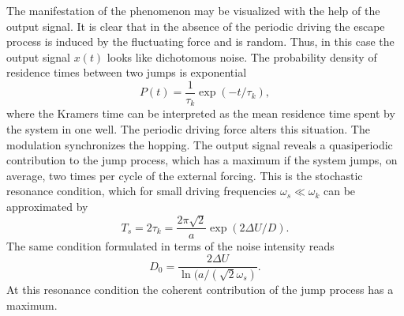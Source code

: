 The manifestation of the phenomenon may be visualized with the help of the
output signal. It is clear that in the absence of the periodic driving
the escape process is induced by the fluctuating force and is random. Thus, in
this case the output signal $x(t)$ looks like dichotomous noise. The
probability density of residence times between two jumps is exponential
\begin{equation}
  P(t) = \frac{1}{\tau_k} \exp(-t/\tau_k),
\end{equation}
where the Kramers time can be
interpreted as the mean residence time spent by the system in one well.
The periodic driving force alters this situation. The modulation synchronizes
the hopping. The output signal reveals a quasiperiodic contribution to the
jump process, which has a maximum if the system jumps, on average, two times
per cycle of the external forcing. This is the stochastic resonance condition,
which for small driving frequencies $\omega_s \ll \omega_k$ 
can be approximated by \cite{Jung}
\begin{equation}
\label{eq:ResonanceCondition}
  T_s = 2 \tau_k = \frac{2 \pi \sqrt{2}}{a} \exp(2 \Delta U / D).
\end{equation}
The same condition formulated in terms of the noise intensity reads
\begin{equation}
\label{eq:ResonanceConditionD}
  D_0 = \frac{2 \Delta U}{\ln(a/(\sqrt{2} \omega_s)}.
\end{equation}
At this resonance condition the coherent contribution of the jump process has
a maximum.


